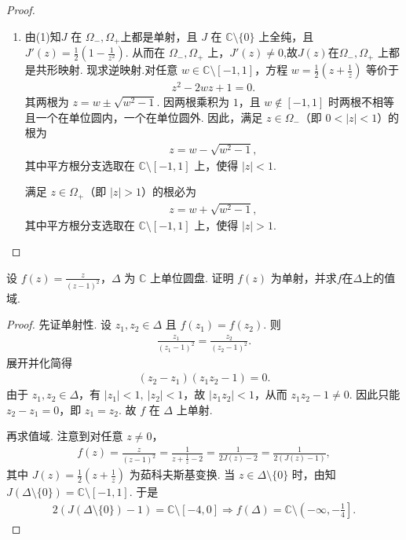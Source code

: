 \documentclass[../../main.tex]{subfiles}%
\begin{document}
\begin{proof}
\begin{enumerate}[(1)]
\item 由(1)知$J$ 在 $\Omega_-,\Omega_+$上都是单射，且 $J$ 在 $\mathbb C\setminus\{0\}$ 上全纯，且 $J'(z)=\frac12(1-\frac1{z^2})$.
从而在 $\Omega_-,\Omega_+$ 上，$J'(z)\neq 0$,故$J(z)$在$\Omega_-,\Omega_+$ 上都是共形映射.
现求逆映射.对任意 $w\in\mathbb C\setminus[-1,1]$，方程 $w=\frac12(z+\frac1z)$ 等价于
\begin{align*}
z^2-2wz+1=0.
\end{align*}
其两根为 $z=w\pm\sqrt{w^2-1}$. 因两根乘积为 $1$，且 $w\notin[-1,1]$ 时两根不相等且一个在单位圆内，一个在单位圆外. 因此，满足 $z\in\Omega_-$（即 $0<|z|<1$）的根为
\begin{align*}
z=w-\sqrt{w^2-1},
\end{align*}
其中平方根分支选取在 $\mathbb C\setminus[-1,1]$ 上，使得 $|z|<1$. 

满足 $z\in\Omega_+$（即 $|z|>1$）的根必为
\begin{align*}
z=w+\sqrt{w^2-1},
\end{align*}
其中平方根分支选取在 $\mathbb C\setminus[-1,1]$ 上，使得 $|z|>1$. 

\end{enumerate}
\end{proof}

\begin{example}
设 \(f(z)=\frac{z}{(z-1)^2}\)，\(\Delta\) 为 \(\mathbb C\) 上单位圆盘. 证明 \(f(z)\) 为单射，并求$f$在$\Delta$上的值域.
\end{example}
\begin{proof}

先证单射性. 设 \(z_1,z_2\in\Delta\) 且 \(f(z_1)=f(z_2)\). 则
\begin{align*}
\frac{z_1}{(z_1-1)^2}=\frac{z_2}{(z_2-1)^2}.
\end{align*}
展开并化简得
\begin{align*}
(z_2-z_1)(z_1z_2-1)=0.
\end{align*}
由于 \(z_1,z_2\in\Delta\)，有 \(|z_1|<1,\ |z_2|<1\)，故 \(|z_1z_2|<1\)，从而 \(z_1z_2-1\neq 0\). 因此只能 \(z_2-z_1=0\)，即 \(z_1=z_2\). 故 \(f\) 在 \(\Delta\) 上单射.

再求值域. 注意到对任意 \(z\neq 0\)，
\begin{align*}
f(z)=\frac{z}{(z-1)^2}
=\frac{1}{z+\frac1z-2}
=\frac{1}{2J(z)-2}
=\frac{1}{2(J(z)-1)},
\end{align*}
其中 \(J(z)=\frac12(z+\frac1z)\) 为茹科夫斯基变换. 当 \(z\in\Delta\setminus\{0\}\) 时，由知\(J(\Delta\setminus\{0\})=\mathbb C\setminus[-1,1]\). 于是
\begin{align*}
2(J(\Delta\setminus \{0\})-1) = \mathbb C\setminus[-4,0]\Longrightarrow f(\Delta)=\mathbb C\setminus\left(-\infty,-\frac14\right].
\end{align*}
\end{proof}
\end{document}
